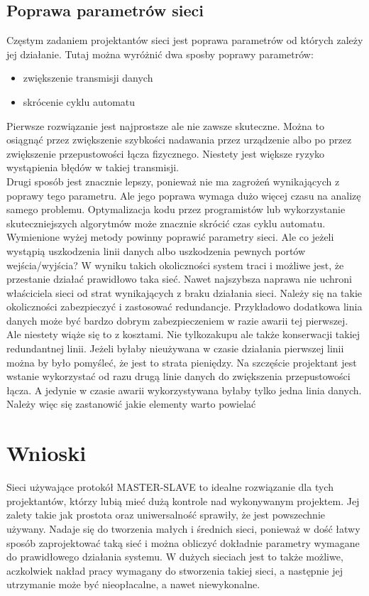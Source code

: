 	\subsection{Poprawa parametrów sieci}
		Częstym zadaniem projektantów sieci jest poprawa parametrów od których zależy jej działanie. Tutaj można wyróżnić dwa sposby poprawy parametrów:
		\begin{itemize}
			\item zwiększenie transmisji danych
			\item skrócenie cyklu automatu
		\end{itemize}
		Pierwsze rozwiązanie jest najprostsze ale nie zawsze skuteczne. Można to osiągnąć przez zwiększenie szybkości nadawania przez urządzenie albo po przez zwiększenie przepustowości łącza fizycznego. Niestety jest większe ryzyko wystąpienia błędów w takiej transmisji.
		\\
		Drugi sposób jest znacznie lepszy, ponieważ nie ma zagrożeń wynikających z poprawy tego parametru. Ale jego poprawa wymaga dużo więcej czasu na analizę samego problemu. Optymalizacja kodu przez programistów lub wykorzystanie skuteczniejszych algorytmów może znacznie skrócić czas cyklu automatu.
		\\
		Wymienione wyżej metody powinny poprawić parametry sieci. Ale co jeżeli wystąpią uszkodzenia linii danych albo uszkodzenia pewnych portów wejścia/wyjścia? W wyniku takich okoliczności system traci i możliwe jest, że przestanie działać prawidłowo taka sieć. Nawet najszybsza naprawa nie uchroni właściciela sieci od strat wynikających z braku działania sieci. Należy się na takie okoliczności zabezpieczyć i zastosować redundancje. Przykładowo dodatkowa linia danych może być bardzo dobrym zabezpieczeniem w razie awarii tej pierwszej. Ale niestety wiąże się to z kosztami. Nie tylkozakupu ale także konserwacji takiej redundantnej linii. Jeżeli byłaby nieużywana w czasie działania pierwszej linii można by było pomyśleć, że jest to strata pieniędzy. Na szczęście projektant jest wstanie wykorzystać od razu drugą linie danych do zwiększenia przepustowości łącza. A jedynie w czasie awarii wykorzystywana byłaby tylko jedna linia danych. Należy więc się zastanowić jakie elementy warto powielać
		
\section{Wnioski}
		Sieci używające protokół MASTER-SLAVE to idealne rozwiązanie dla tych projektantów, którzy lubią mieć dużą kontrole nad wykonywanym projektem. Jej zalety takie jak prostota oraz uniwersalność sprawiły, że jest powszechnie używany. Nadaje się do tworzenia małych i średnich sieci, ponieważ w dość łatwy sposób zaprojektować taką sieć i można obliczyć dokładnie parametry wymagane do prawidłowego działania systemu. W dużych sieciach jest to także możliwe, aczkolwiek nakład pracy wymagany do stworzenia takiej sieci, a następnie jej utrzymanie może być nieopłacalne, a nawet niewykonalne.
		\\
		
		